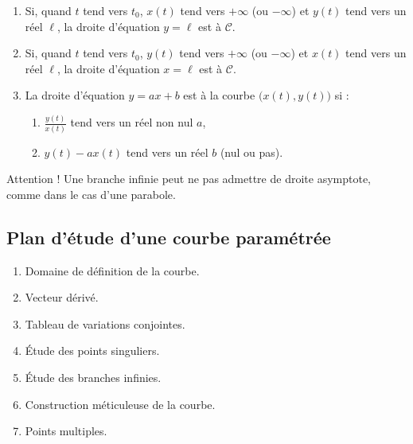 \documentclass[10pt,class=article,crop=false]{standalone}
\begin{document}
\begin{multicols}{2}
\begin{enumerate}
	\item Si, quand $t$ tend vers $t_0$, $x(t)$ tend vers $+\infty$ (ou
	$-\infty$) et $y(t)$ tend vers un réel $\ell$, la droite d'équation
	$y=\ell$ est  à $\mathcal{C}$.
	
	\item Si, quand $t$ tend vers $t_0$, $y(t)$ tend vers $+\infty$ (ou
	$-\infty$) et $x(t)$ tend vers un réel $\ell$, la droite d'équation
	$x=\ell$ est  à $\mathcal{C}$.
 
   \item La droite d'équation
	$y=ax+b$ est  à la courbe $\big(x(t),y(t) \big)$ si :
	\begin{enumerate}
		\item $\frac{y(t)}{x(t)}$ tend vers un réel non nul $a$,
		\item $y(t)-ax(t)$ tend vers un réel $b$ (nul ou pas).
	\end{enumerate}
\end{enumerate}



Attention ! Une branche infinie peut ne pas admettre de droite asymptote, comme dans le cas d'une parabole.


\subsection{Plan d'étude d'une courbe paramétrée}

\begin{enumerate}
	\item Domaine de définition de la courbe.
	
	\item Vecteur dérivé.
		
	\item Tableau de variations conjointes.
		
	\item Étude des points singuliers.
	
	\item Étude des branches infinies.
	
	\item Construction méticuleuse de la courbe.
	
	\item Points multiples.
	

\end{enumerate}
\end{multicols}
\end{document}
